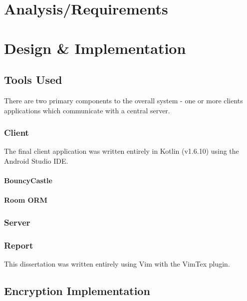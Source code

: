 \documentclass{mproj}
\begin{document}
\chapter{Analysis/Requirements}\label{analysis}

\chapter{Design \& Implementation}\label{design}

\section{Tools Used}
There are two primary components to the overall system - one or more clients applications which communicate with a central server.

\subsection{Client}
The final client application was written entirely in Kotlin (v1.6.10) using the Android Studio IDE.
\subsubsection{BouncyCastle}

\subsubsection{Room ORM}

\subsubsection{}


\subsection{Server}

\subsection{Report}
This dissertation was written entirely using Vim with the VimTex plugin.
\section{Encryption Implementation}\label{encryption}
\end{document}
